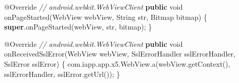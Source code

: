 \documentclass[
]{article}
\newenvironment{Shaded}{}{}
\newcommand{\AttributeTok}[1]{\textcolor[rgb]{0.49,0.56,0.16}{#1}}
\newcommand{\BuiltInTok}[1]{\textcolor[rgb]{0.00,0.50,0.00}{#1}}
\newcommand{\CommentTok}[1]{\textcolor[rgb]{0.38,0.63,0.69}{\textit{#1}}}
\newcommand{\DataTypeTok}[1]{\textcolor[rgb]{0.56,0.13,0.00}{#1}}
\newcommand{\FunctionTok}[1]{\textcolor[rgb]{0.02,0.16,0.49}{#1}}
\newcommand{\KeywordTok}[1]{\textcolor[rgb]{0.00,0.44,0.13}{\textbf{#1}}}
\newcommand{\NormalTok}[1]{#1}
\newcommand{\OperatorTok}[1]{\textcolor[rgb]{0.40,0.40,0.40}{#1}}
\begin{document}
\begin{Shaded}
\begin{Highlighting}[]
        \AttributeTok{@Override} \CommentTok{// android.webkit.WebViewClient}
        \KeywordTok{public} \DataTypeTok{void} \FunctionTok{onPageStarted}\OperatorTok{(}\NormalTok{WebView webView}\OperatorTok{,} \BuiltInTok{String}\NormalTok{ str}\OperatorTok{,}\NormalTok{ Bitmap bitmap}\OperatorTok{)} \OperatorTok{\{}
            \KeywordTok{super}\OperatorTok{.}\FunctionTok{onPageStarted}\OperatorTok{(}\NormalTok{webView}\OperatorTok{,}\NormalTok{ str}\OperatorTok{,}\NormalTok{ bitmap}\OperatorTok{);}
        \OperatorTok{\}}

        \AttributeTok{@Override} \CommentTok{// android.webkit.WebViewClient}
        \KeywordTok{public} \DataTypeTok{void} \FunctionTok{onReceivedSslError}\OperatorTok{(}\NormalTok{WebView webView}\OperatorTok{,}\NormalTok{ SslErrorHandler sslErrorHandler}\OperatorTok{,}\NormalTok{ SslError sslError}\OperatorTok{)} \OperatorTok{\{}
\NormalTok{            com}\OperatorTok{.}\FunctionTok{iapp}\OperatorTok{.}\FunctionTok{app}\OperatorTok{.}\FunctionTok{x5}\OperatorTok{.}\FunctionTok{WebView}\OperatorTok{.}\FunctionTok{a}\OperatorTok{(}\NormalTok{webView}\OperatorTok{.}\FunctionTok{getContext}\OperatorTok{(),}\NormalTok{ sslErrorHandler}\OperatorTok{,}\NormalTok{ sslError}\OperatorTok{.}\FunctionTok{getUrl}\OperatorTok{());}
        \OperatorTok{\}}


\end{Highlighting}
\end{Shaded}
\end{document}
